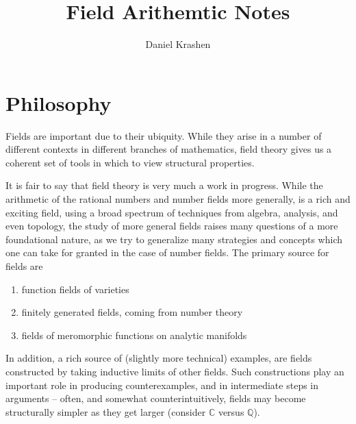 \documentclass[12pt]{report}
\theoremstyle{plain}
\begin{document}


\author{Daniel Krashen}
\title{Field Arithemtic Notes}

\maketitle
\tableofcontents


\chapter{Philosophy}

Fields are important due to their ubiquity. While they arise in a number of
different contexts in different branches of mathematics, field theory gives
us a coherent set of tools in which to view structural properties.

It is fair to say that field theory is very much a work in progress. While
the arithmetic of the rational numbers and number fields more generally, is
a rich and exciting field, using a broad spectrum of techniques from
algebra, analysis, and even topology, the study of more general fields
raises many questions of a more foundational nature, as we try to
generalize many strategies and concepts which one can take for granted in
the case of number fields. The primary source for fields are
\begin{enumerate}
\item function fields of varieties
\item finitely generated fields, coming from number theory
\item fields of meromorphic functions on analytic manifolds
\end{enumerate}
In addition, a rich source of (slightly more technical) examples, are
fields constructed by taking inductive limits of other fields. Such
constructions play an important role in producing counterexamples, and in
intermediate steps in arguments -- often, and somewhat counterintuitively,
fields may become structurally simpler as they get larger (consider
$\mathbb C$ versus $\mathbb Q$).
\end{document}
